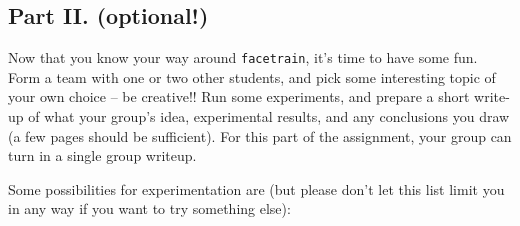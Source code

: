 \subsection{Part II. (optional!)}

Now that you know your way around {\tt facetrain}, it's time to have some fun.
Form a team with one or two other students, and pick some interesting topic of
your own choice -- be creative!!  Run some experiments, and prepare a short
write-up of what your group's idea, experimental results, and any conclusions
you draw (a few pages should be sufficient).  For this part of the assignment,
your group can turn in a single group writeup.


Some possibilities for experimentation are (but please don't let this list
limit you in any way if you want to try something else):

